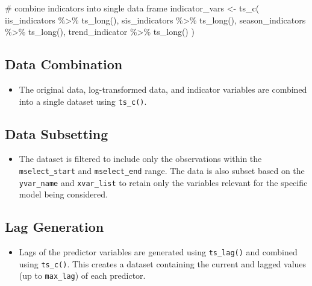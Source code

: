 \documentclass[
  letterpaper,
  DIV=11,
  numbers=noendperiod]{scrreport}
\newenvironment{Shaded}{\begin{snugshade}}{\end{snugshade}}
\newcommand{\CommentTok}[1]{\textcolor[rgb]{0.37,0.37,0.37}{#1}}
\newcommand{\FunctionTok}[1]{\textcolor[rgb]{0.28,0.35,0.67}{#1}}
\newcommand{\NormalTok}[1]{\textcolor[rgb]{0.00,0.23,0.31}{#1}}
\newcommand{\OtherTok}[1]{\textcolor[rgb]{0.00,0.23,0.31}{#1}}
\newcommand{\SpecialCharTok}[1]{\textcolor[rgb]{0.37,0.37,0.37}{#1}}
\providecommand{\tightlist}{%
  \setlength{\itemsep}{0pt}\setlength{\parskip}{0pt}}\usepackage{longtable,booktabs,array}
\begin{document}
\begin{Shaded}
\begin{Highlighting}[]
\CommentTok{\# combine indicators into single data frame}
\NormalTok{indicator\_vars }\OtherTok{\textless{}{-}} \FunctionTok{ts\_c}\NormalTok{(}
\NormalTok{  iis\_indicators }\SpecialCharTok{\%\textgreater{}\%} \FunctionTok{ts\_long}\NormalTok{(),}
\NormalTok{  sis\_indicators }\SpecialCharTok{\%\textgreater{}\%} \FunctionTok{ts\_long}\NormalTok{(),}
\NormalTok{  season\_indicators }\SpecialCharTok{\%\textgreater{}\%} \FunctionTok{ts\_long}\NormalTok{(),}
\NormalTok{  trend\_indicator }\SpecialCharTok{\%\textgreater{}\%} \FunctionTok{ts\_long}\NormalTok{()}
\NormalTok{)}
\end{Highlighting}
\end{Shaded}

\subsection{Data Combination}\label{data-combination}

\begin{itemize}
\tightlist
\item
  The original data, log-transformed data, and indicator variables are
  combined into a single dataset using \texttt{ts\_c()}.
\end{itemize}

\subsection{Data Subsetting}\label{data-subsetting}

\begin{itemize}
\tightlist
\item
  The dataset is filtered to include only the observations within the
  \texttt{mselect\_start} and \texttt{mselect\_end} range. The data is
  also subset based on the \texttt{yvar\_name} and \texttt{xvar\_list}
  to retain only the variables relevant for the specific model being
  considered.
\end{itemize}

\subsection{Lag Generation}\label{lag-generation}

\begin{itemize}
\tightlist
\item
  Lags of the predictor variables are generated using \texttt{ts\_lag()}
  and combined using \texttt{ts\_c()}. This creates a dataset containing
  the current and lagged values (up to \texttt{max\_lag}) of each
  predictor.
\end{itemize}
\end{document}
